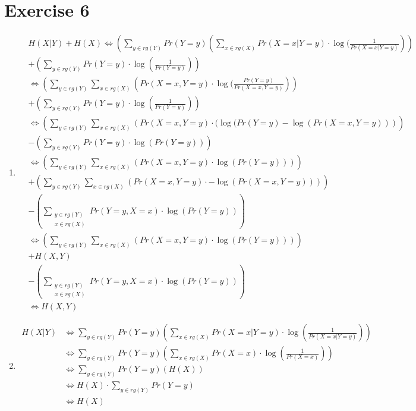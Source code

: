 \documentclass[12pt]{article}
\begin{document}
\section*{Exercise 6}
\begin{enumerate}[label=(\alph*)]
	\item	\begin{align*}
				& H(X \vert Y) + H(X) \Leftrightarrow (\sum_{y \in rg(Y)} Pr(Y=y) \left( \sum_{x \in rg(X)} Pr(X=x \vert Y=y) \cdot \log(\frac{1}{Pr(X=x \vert Y=y)} \right)) \\
				& + (\sum_{y \in rg(Y)} Pr(Y=y) \cdot \log(\frac{1}{Pr(Y=y)})) \\
				&\Leftrightarrow (\sum_{y \in rg(Y)} \sum_{x \in rg(X)} \left(  Pr(X=x, Y=y) \cdot \log(\frac{Pr(Y=y)}{Pr(X=x, Y=y)} \right)) \\
				& + (\sum_{y \in rg(Y)} Pr(Y=y) \cdot \log(\frac{1}{Pr(Y=y)})) \\
				&\Leftrightarrow (\sum_{y \in rg(Y)} \sum_{x \in rg(X)} \left( Pr(X=x, Y=y) \cdot (\log(Pr(Y=y) - \log(Pr(X=x, Y=y)) \right)) \\
				& - (\sum_{y \in rg(Y)} Pr(Y=y) \cdot \log(Pr(Y=y))) \\
				&\Leftrightarrow (\sum_{y \in rg(Y)} \sum_{x \in rg(X)} \left( Pr(X=x, Y=y) \cdot \log(Pr(Y=y)) \right)) \\
				& + (\sum_{y \in rg(Y)} \sum_{x \in rg(X)} \left( Pr(X=x, Y=y) \cdot -\log(Pr(X=x, Y=y)) \right)) \\
				& - (\sum\limits_{\substack{y \in rg(Y) \\ x \in rg(X)}} Pr(Y=y, X=x) \cdot \log(Pr(Y=y))) \\
				&\Leftrightarrow (\sum_{y \in rg(Y)} \sum_{x \in rg(X)} \left( Pr(X=x, Y=y) \cdot \log(Pr(Y=y)) \right)) \\
				& + H(X,Y) \\
				& - (\sum\limits_{\substack{y \in rg(Y) \\ x \in rg(X)}} Pr(Y=y, X=x) \cdot \log(Pr(Y=y))) \\
				&\Leftrightarrow H(X,Y)
			\end{align*}
	\item	\begin{align*}
				H(X \vert Y) &\Leftrightarrow \sum_{y \in rg(Y)} Pr(Y=y) \left( \sum_{x \in rg(X)} Pr(X=x \vert Y=y) \cdot \log(\frac{1}{Pr(X=x \vert Y=y)}) \right) \\
				&\Leftrightarrow \sum_{y \in rg(Y)} Pr(Y=y) \left( \sum_{x \in rg(X)} Pr(X=x) \cdot \log(\frac{1}{Pr(X=x)}) \right) \\
				&\Leftrightarrow \sum_{y \in rg(Y)} Pr(Y=y) \left( H(X) \right) \\
				&\Leftrightarrow H(X) \cdot \sum_{y \in rg(Y)} Pr(Y=y) \\
				&\Leftrightarrow H(X) \\
			\end{align*}
\end{enumerate}
\end{document}
